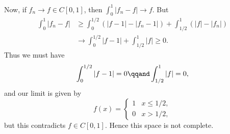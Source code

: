 \begin{example}
	Now, if $f_n \to f \in C[0,1]$, then $\int_0^1 \left\vert f_n-f \right\vert \to f$. But
	\begin{align*}
		\int_0^1 \left\vert f_n - f \right\vert
		&\geq \int_0^{1/2} \left( \left\vert f-1 \right\vert - \left\vert f_n-1 \right\vert \right) + \int_{1/2}^1 \left( \left\vert f \right\vert-\left\vert f_n \right\vert \right) \\
		&\to \int_0^{1/2} \left\vert f-1 \right\vert + \int_{1/2}^1 \left\vert f \right\vert \geq 0.
	\end{align*}
	Thus we must have
	\begin{equation*}
		\int_0^{1/2} \left\vert f-1 \right\vert = 0
		\qqand
		\int_{1/2}^1 \left\vert f \right\vert = 0,
	\end{equation*}
	and our limit is given by
	\begin{equation*}
		f(x) =
		\begin{cases}
			1 & x\leq 1/2, \\
			0 & x>1/2,
		\end{cases}
	\end{equation*}
	but this contradicts $f \in C[0,1]$. Hence this space is not complete.
\end{example}

